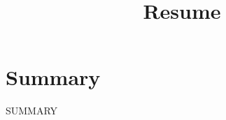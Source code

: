 \documentclass{article}
\title{Resume}
\author{}
\date{}
\begin{document}
\maketitle

\section*{Summary}
{{SUMMARY}}
\end{document}

